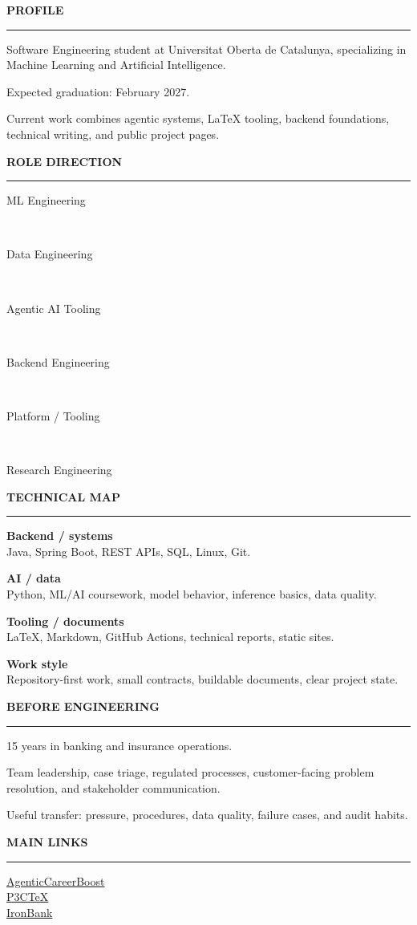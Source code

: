 \documentclass[a4paper,10pt]{article}
\newcommand{\railsection}[1]{%
	\vspace{0.44em}
	{\scriptsize\bfseries\MakeUppercase{#1}}\par
	\vspace{0.08em}
	{\color{line}\hrule}
	\vspace{0.18em}
}
\newcommand{\tag}[1]{%
	{\scriptsize\colorbox{soft}{\strut\hspace{0.22em}#1\hspace{0.22em}}}
}
\begin{document}
	\begin{minipage}[t]{0.275\textwidth}
		\scriptsize

		\railsection{Profile}

		Software Engineering student at Universitat Oberta de Catalunya, specializing in Machine Learning and Artificial Intelligence.

		Expected graduation: February 2027.

		Current work combines agentic systems, LaTeX tooling, backend foundations, technical writing, and public project pages.\footnotemark

		\railsection{Role direction}

		\tag{ML Engineering}\\[0.16em]
		\tag{Data Engineering}\\[0.16em]
		\tag{Agentic AI Tooling}\\[0.16em]
		\tag{Backend Engineering}\\[0.16em]
		\tag{Platform / Tooling}\\[0.16em]
		\tag{Research Engineering}

		\railsection{Technical map}

		\textbf{Backend / systems}\\
		Java, Spring Boot, REST APIs, SQL, Linux, Git.

		\vspace{0.20em}
		\textbf{AI / data}\\
		Python, ML/AI coursework, model behavior, inference basics, data quality.

		\vspace{0.20em}
		\textbf{Tooling / documents}\\
		LaTeX, Markdown, GitHub Actions, technical reports, static sites.

		\vspace{0.20em}
		\textbf{Work style}\\
		Repository-first work, small contracts, buildable documents, clear project state.

		\railsection{Before engineering}

		15 years in banking and insurance operations.

		Team leadership, case triage, regulated processes, customer-facing problem resolution, and stakeholder communication.

		Useful transfer: pressure, procedures, data quality, failure cases, and audit habits.

		\railsection{Main links}

		\href{https://github.com/DidacLL/AgenticCareerBoost}{AgenticCareerBoost}\\
		\href{https://github.com/DidacLL/P3CTeX}{P3CTeX}\\
		\href{https://github.com/DidacLL/Ironhack-IronBank_FinalProject_vBNKsys}{IronBank}

	\end{minipage}
\end{document}
